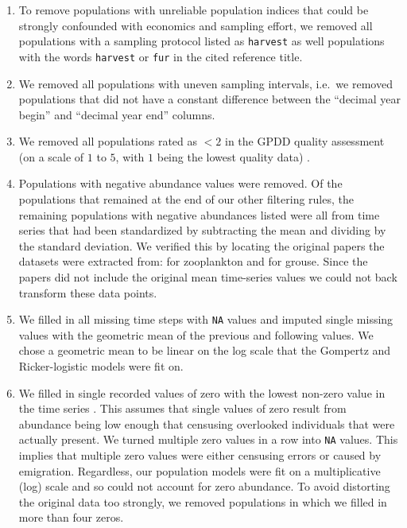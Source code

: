 \begin{enumerate}

\item To remove populations with unreliable population indices that could be
  strongly confounded with economics and sampling effort, we removed all
  populations with a sampling protocol listed as \texttt{harvest} as well
  populations with the words \texttt{harvest} or \texttt{fur} in the cited
  reference title.

\item We removed all populations with uneven sampling intervals, i.e.\ we
  removed populations that did not have a constant difference between the
  ``decimal year begin'' and ``decimal year end'' columns.

\item We removed all populations rated as $< 2$ in the GPDD quality assessment
  (on a scale of $1$ to $5$, with $1$ being the lowest quality data)
  \citep[following][]{sibly2005, ziebarth2010}.

\item Populations with negative abundance values were removed. Of the
  populations that remained at the end of our other filtering rules, the
  remaining populations with negative abundances listed were all from time
  series that had been standardized by subtracting the mean and dividing by the
  standard deviation. We verified this by locating the original papers the
  datasets were extracted from: \citet{colebrook1978} for zooplankton and
  \citet{lindstrom1995} for grouse. Since the papers did not include the
  original mean time-series values we could not back transform these data
  points.

\item We filled in all missing time steps with \texttt{NA} values and imputed
  single missing values with the geometric mean of the previous and following
  values. We chose a geometric mean to be linear on the log scale that the
  Gompertz and Ricker-logistic models were fit on.

\item We filled in single recorded values of zero with the lowest non-zero
  value in the time series \citep[following][]{brook2006a}. This assumes that
  single values of zero result from abundance being low enough that censusing
  overlooked individuals that were actually present. We turned multiple zero
  values in a row into \texttt{NA} values. This implies that multiple zero
  values were either censusing errors or caused by emigration. Regardless, our
  population models were fit on a multiplicative (log) scale and so could not
  account for zero abundance. To avoid distorting the original data too
  strongly, we removed populations in which we filled in more than four zeros.


\end{enumerate}
